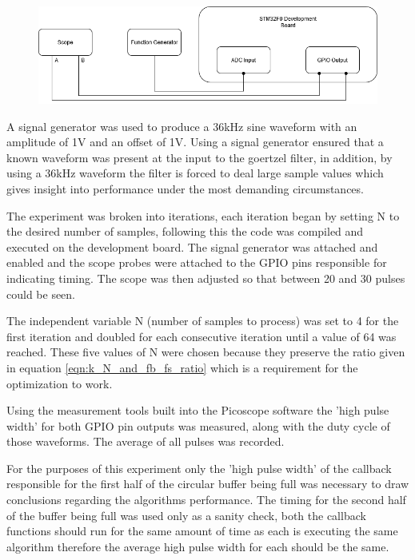 \begin{figure}[H]
	\centering
	\includegraphics[width=.9\linewidth]{figures/experimentation/goertzel_speed_test_diagram.png}
	\label{fig:goertzel_optimization_experiemnt}
\end{figure}

A signal generator was used to produce a 36kHz sine waveform with an amplitude of 1V and an offset of 1V. Using a signal generator ensured that a known waveform was present at the input to the goertzel filter, in addition, by using a 36kHz waveform the filter is forced to deal large sample values which gives insight into performance under the most demanding circumstances.

The experiment was broken into iterations, each iteration began by setting N to the desired number of samples, following this the code was compiled and executed on the development board. The signal generator was attached and enabled and the scope probes were attached to the GPIO pins responsible for indicating timing. The scope was then adjusted so that between 20 and 30 pulses could be seen. 

The independent variable N (number of samples to process) was set to 4 for the first iteration and doubled for each consecutive iteration until a value of 64 was reached. These five values of N were chosen because they preserve the ratio given in equation \ref{eqn:k_N_and_fb_fs_ratio} which is a requirement for the optimization to work.

Using the measurement tools built into the Picoscope software the 'high pulse width' for both GPIO pin outputs was measured, along with the duty cycle of those waveforms. The average of all pulses was recorded.

For the purposes of this experiment only the 'high pulse width' of the callback responsible for the first half of the circular buffer being full was necessary to draw conclusions regarding the algorithms performance. The timing for the second half of the buffer being full was used only as a sanity check, both the callback functions should run for the same amount of time as each is executing the same algorithm therefore the average high pulse width for each should be the same.


